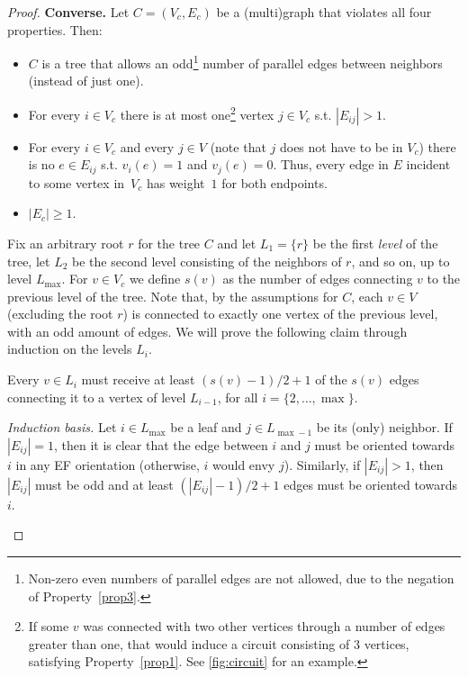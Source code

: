 \documentclass[11pt,letterpaper]{article}
\begin{document}
\begin{proof}
    \textbf{Converse.} Let $C=(V_c,E_c)$ be a (multi)graph that violates all four properties. Then:
    \begin{itemize}
        \item $C$ is a tree that allows an odd\footnote{Non-zero even numbers of parallel edges are not allowed, due to the negation of Property~\ref{prop3}.} number of parallel edges between neighbors (instead of just one).
        \item For every $i \in V_c$ there is at most one\footnote{If some $v$ was connected with two other vertices through a number of edges greater than one, that would induce a circuit consisting of $3$ vertices, satisfying Property~\ref{prop1}. See \cref{fig:circuit} for an example.} vertex $j\in V_c$ s.t. $|E_{ij}|>1$.
        \item For every $i \in V_c$ and every $j \in V$ (note that $j$ does not have to be in $V_c$) there is no $e\in E_{ij}$ s.t. $v_i(e)=1$ and $v_j(e)=0$. Thus, every edge in $E$ incident to some vertex in~$V_c$ has weight~$1$ for both endpoints.
        \item $|E_c| \geq 1$.
    \end{itemize}

    Fix an arbitrary root $r$ for the tree $C$ and let $L_1 =\{r\}$ be the first \emph{level} of the tree, let $L_2$ be the second level consisting of the neighbors of $r$, and so on, up to level $L_{\max}$. For $v\in V_c$ we define $s(v)$ as the number of edges connecting $v$ to the previous level of the tree. Note that, by the assumptions for $C$, each $v\in V$ (excluding the root $r$) is connected to exactly one vertex of the previous level, with an odd amount of edges. We will prove the following claim through induction on the levels $L_i$.

    \begin{claim}\label{claim:induction_tree}
        Every $v\in L_{i}$ must receive at least $(s(v)-1)/2 +1$ of the $s(v)$ edges connecting it to a vertex of level $L_{i-1}$, for all $i=\{2,\ldots,\max\}$.
    \end{claim}

    \begin{nestedproof}

    \emph{Induction basis.} Let $i\in L_{\max}$ be a leaf and $j\in L_{\max-1}$ be its (only) neighbor. If $|E_{ij}|=1$, then it is clear that the edge between $i$ and $j$ must be oriented towards $i$ in any EF orientation (otherwise, $i$ would envy $j$). Similarly, if $|E_{ij}|>1$, then $|E_{ij}|$ must be odd and at least $(|E_{ij}|-1)/2 +1$ edges must be oriented towards $i$.


\end{nestedproof}
\end{proof}
\end{document}
